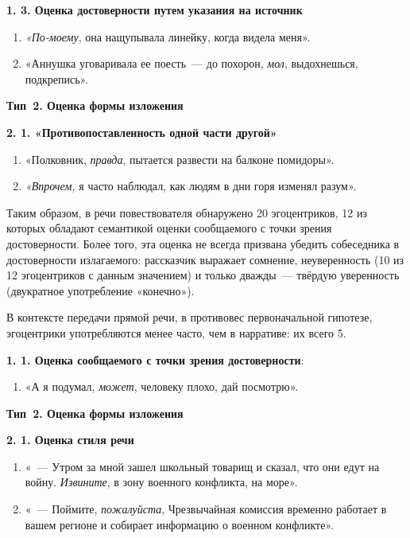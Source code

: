 \documentclass{kursa4}
\begin{document}
{      \textbf{1. 3. Оценка достоверности путем указания на источник}
        \setcounter{saveenum}{\value{enumi}}
        \begin{enumerate}
        \setcounter{enumi}{\value{saveenum}}
        \item \textit{«По-моему}, она нащупывала линейку, когда видела меня». \item «Аннушка уговаривала ее поесть~--- до похорон, \textit{мол}, выдохнешься, подкрепись». \end{enumerate}

      {\centering
      \textbf{Тип~2. Оценка формы изложения}
      \par}

      \textbf{2. 1. «Противопоставленность одной части другой»}
        \setcounter{saveenum}{\value{enumi}}
        \begin{enumerate}
        \setcounter{enumi}{\value{saveenum}}
        \item «Полковник, \textit{правда}, пытается развести на балконе помидоры». \item \textit{«Впрочем,} я часто наблюдал, как людям в дни горя изменял разум». \end{enumerate}

      Таким образом, в речи повествователя обнаружено 20 эгоцентриков, 12 из которых обладают семантикой оценки сообщаемого с точки зрения достоверности. Более того, эта оценка не всегда призвана убедить собеседника в достоверности излагаемого: рассказчик выражает сомнение, неуверенность (10 из 12 эгоцентриков с данным значением) и только дважды~--- твёрдую уверенность (двукратное употребление «конечно»). 

      В контексте передачи прямой речи, в противовес первоначальной гипотезе, эгоцентрики употребляются менее часто, чем в нарративе: их всего 5. 

      {\par}

      \textbf{1. 1. Оценка сообщаемого с точки зрения достоверности}: \begin{enumerate}
        \item «А я подумал, \textit{может}, человеку плохо, дай посмотрю». \end{enumerate}

      {\centering
      \textbf{Тип~2. Оценка формы изложения }
      \par}

      \textbf{2. 1. Оценка стиля речи}
        \setcounter{saveenum}{\value{enumi}}
        \begin{enumerate}
        \setcounter{enumi}{\value{saveenum}}
        \item «~--- Утром за мной зашел школьный товарищ и сказал, что они едут на войну. \textit{Извините}, в зону военного конфликта, на море». 
        \item «~--- Поймите, \textit{пожалуйста}, Чрезвычайная комиссия временно работает в вашем регионе и собирает информацию о военном конфликте». \end{enumerate}

}
\end{document}
